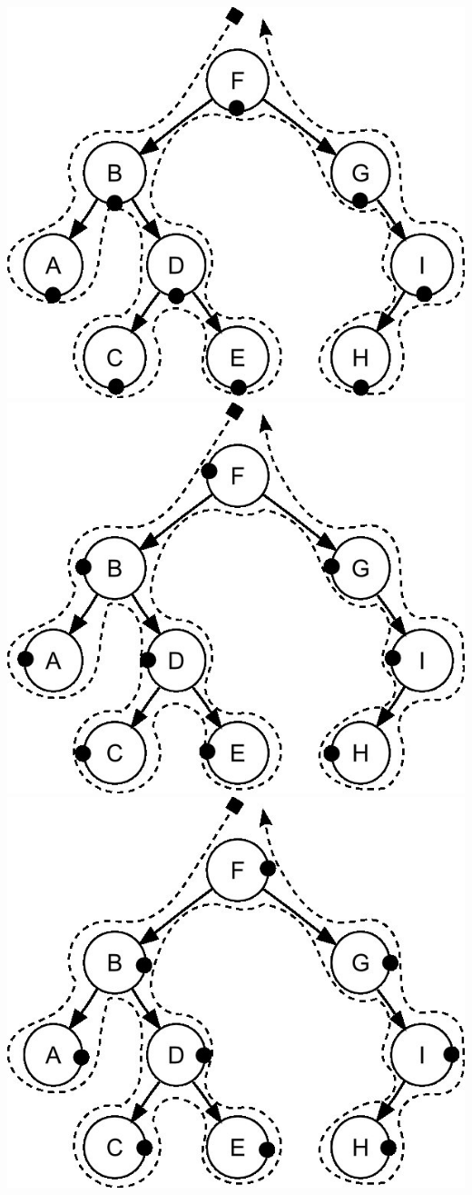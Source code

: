 \documentclass[paper=a4, fontsize=10pt]{scrartcl} %
\begin{document}
\includegraphics[scale=0.5]{Sorted_binary_tree_inorder.jpg}\includegraphics[scale=0.5]{Sorted_binary_tree_preorder.jpg}\includegraphics[scale=0.5]{Sorted_binary_tree_postorder.jpg}\\
\end{document}
